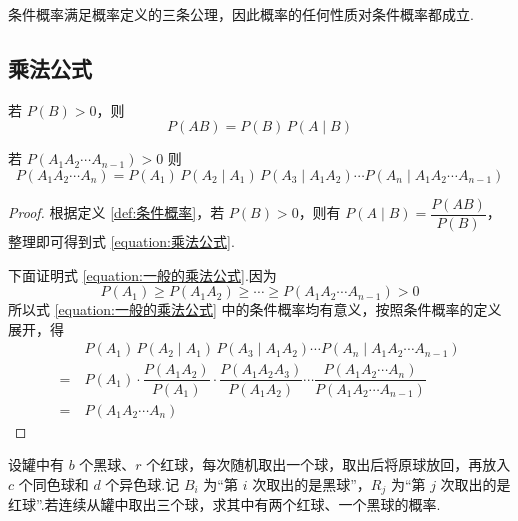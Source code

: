 条件概率满足概率定义的三条公理，因此概率的任何性质对条件概率都成立.

\subsection{乘法公式}

\begin{theorem}[][乘法公式]
    \indent 若 $P(B)>0$，则
    \begin{equation} \label{equation:乘法公式}
        P(AB) = P(B) \, P(A \mid B)    
    \end{equation}
    
    若 $P(A_1 A_2 \cdots A_{n-1}) > 0$ 则
    \begin{equation} \label{equation:一般的乘法公式}
        P(A_1 A_2 \cdots A_n) = P(A_1) \, P(A_2 \mid A_1) \, P(A_3 \mid A_1 A_2) \cdots P(A_n \mid A_1 A_2 \cdots A_{n-1})
    \end{equation}
\end{theorem}

\begin{proof}
    根据定义 \ref{def:条件概率}，若 $P(B)>0$，则有 $P(A \mid B) = \dfrac{P(AB)}{P(B)}$，整理即可得到式 \eqref{equation:乘法公式}.

    下面证明式 \eqref{equation:一般的乘法公式}.因为
    $$
    P(A_1) \geqslant P(A_1 A_2) \geqslant \cdots \geqslant P(A_1 A_2 \cdots A_{n-1}) > 0
    $$
    所以式 \eqref{equation:一般的乘法公式} 中的条件概率均有意义，按照条件概率的定义展开，得
    $$
    \begin{aligned}
        & P(A_1) \, P(A_2 \mid A_1) \, P(A_3 \mid A_1 A_2) \cdots P(A_n \mid A_1 A_2 \cdots A_{n-1}) \\
        =\ & P(A_1) \cdot \dfrac{P(A_1 A_2)}{P(A_1)} \cdot \dfrac{P(A_1 A_2 A_3)}{P(A_1 A_2)} \cdots \dfrac{P(A_1 A_2 \cdots A_n)}{P(A_1 A_2 \cdots A_{n-1})} \\
        =\ & P(A_1 A_2 \cdots A_n)
    \end{aligned}
    $$

    \vspace{-2em}
\end{proof}

\begin{example}[][波利亚罐子模型]
    \indent 设罐中有 $b$ 个黑球、$r$ 个红球，每次随机取出一个球，取出后将原球放回，再放入 $c$ 个同色球和 $d$ 个异色球.记 $B_i$ 为“第 $i$ 次取出的是黑球”，$R_j$ 为“第 $j$ 次取出的是红球”.若连续从罐中取出三个球，求其中有两个红球、一个黑球的概率.
\end{example}

